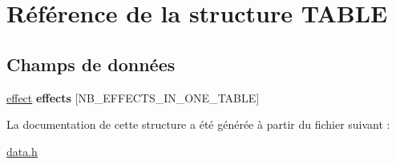 \hypertarget{struct_t_a_b_l_e}{
\section{Référence de la structure TABLE}
\label{struct_t_a_b_l_e}
}
\subsection*{Champs de données}
\begin{DoxyCompactItemize}
\item 
\hypertarget{struct_t_a_b_l_e_aa7196468994f526bb6523a0e4e165954}{
\hyperlink{struct_e_f_f_e_c_t}{effect} {\bfseries effects} \mbox{[}NB\_\-EFFECTS\_\-IN\_\-ONE\_\-TABLE\mbox{]}}
\label{struct_t_a_b_l_e_aa7196468994f526bb6523a0e4e165954}

\end{DoxyCompactItemize}


La documentation de cette structure a été générée à partir du fichier suivant :\begin{DoxyCompactItemize}
\item 
\hyperlink{data_8h}{data.h}\end{DoxyCompactItemize}
